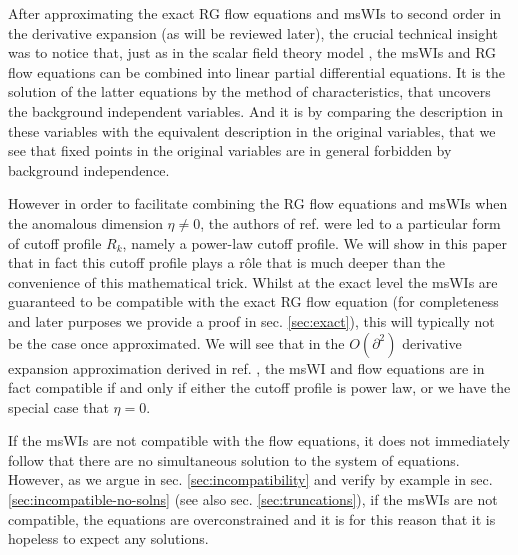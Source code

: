 \documentclass[11pt]{book} %
\begin{document}
After approximating the exact RG flow equations and msWIs to second order in the derivative expansion (as will be reviewed later),
the crucial technical insight was to notice that, just as in the scalar field theory model
\cite{Bridle:2013sra}, the msWIs and RG flow equations can be combined into linear partial differential equations. It is the solution of the latter equations by the method of characteristics, that uncovers the background independent variables. And it is by comparing the description in these variables with the equivalent description in the original variables,
that we see that fixed points in the original variables are in general forbidden by  background independence.

However in order to facilitate combining the RG flow equations and msWIs when the anomalous dimension $\eta\ne0$, the authors of ref. \cite{Dietz:2015owa} were led to a particular form of cutoff profile $R_k$, namely a power-law cutoff profile. We will show in this paper that in fact this cutoff profile plays a r\^ole that is much deeper than the convenience of this mathematical trick.
Whilst at the exact level the msWIs are guaranteed to be compatible with the exact RG flow equation (for completeness and later purposes we provide a proof in sec. \ref{sec:exact}), this will typically not be the case once approximated.
We will see that in the $O(\partial^2)$ derivative expansion approximation derived in ref. \cite{Dietz:2015owa}, the msWI and flow equations are in fact compatible {if and only if} either the cutoff profile is power law, or we have the special case that $\eta=0$.


If the msWIs are not compatible with the flow equations, it does not immediately follow that there are no simultaneous solution to the system of equations. However, as we argue in sec. \ref{sec:incompatibility} and verify by example in sec. \ref{sec:incompatible-no-solns} (see also sec. \ref{sec:truncations}), if the msWIs are not compatible, the equations are overconstrained and it is for this reason that it is hopeless to expect any solutions.
\end{document}
